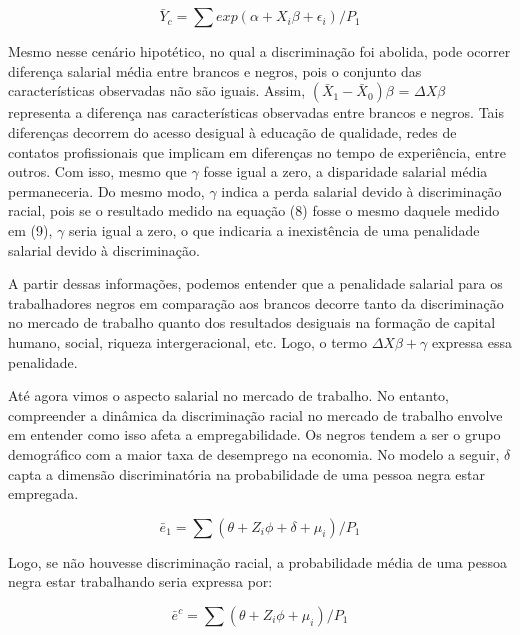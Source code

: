 \documentclass{article}
\begin{document}
	\begin{equation}
		\bar{Y}_{c} = \sum exp(\alpha + X_{i}\beta +  \epsilon_{i})/P_{1} 
	\end{equation}
	
	Mesmo nesse cenário hipotético, no qual a discriminação foi abolida, pode ocorrer diferença salarial média entre brancos e negros, pois o conjunto das características observadas não são iguais. Assim, $(\bar{X}_{1} - \bar{X}_{0})\beta$ = $\Delta X\beta$ representa a diferença nas características observadas entre brancos e negros. Tais diferenças decorrem do acesso desigual à educação de qualidade, redes de contatos profissionais que implicam em diferenças no tempo de experiência, entre outros. Com isso, mesmo que $\gamma$ fosse igual a zero, a disparidade salarial média permaneceria. Do mesmo modo, $\gamma$ indica a perda salarial devido à discriminação racial, pois se o resultado medido na equação (8) fosse o mesmo daquele medido em (9), $\gamma$ seria igual a zero, o que indicaria a inexistência de uma penalidade salarial devido à discriminação.	\newline
	
	A partir dessas informações, podemos entender que a penalidade salarial para os trabalhadores negros em comparação aos brancos decorre tanto da discriminação no mercado de trabalho quanto dos resultados desiguais na formação de capital humano, social, riqueza intergeracional, etc. Logo, o termo $\Delta X\beta + \gamma$ expressa essa penalidade. \newline
	
	Até agora vimos o aspecto salarial no mercado de trabalho. No entanto, compreender a dinâmica da discriminação racial no mercado de trabalho envolve em entender como isso afeta a empregabilidade. Os negros tendem a ser o grupo demográfico com a maior taxa de desemprego na economia. No modelo a seguir, $\delta$ capta a dimensão discriminatória na probabilidade de uma pessoa negra estar empregada.
	
	\begin{equation}
		\bar{e}_{1} = \sum (\theta + Z_{i}\phi + \delta + \mu_{i})/ P_{1}
	\end{equation}
	
	Logo, se não houvesse discriminação racial, a probabilidade média de uma pessoa negra estar trabalhando seria expressa por:
	
	\begin{equation}
		\bar{e}^{c} = \sum (\theta + Z_{i}\phi + \mu_{i})/ P_{1}
	\end{equation}
	
\end{document}
